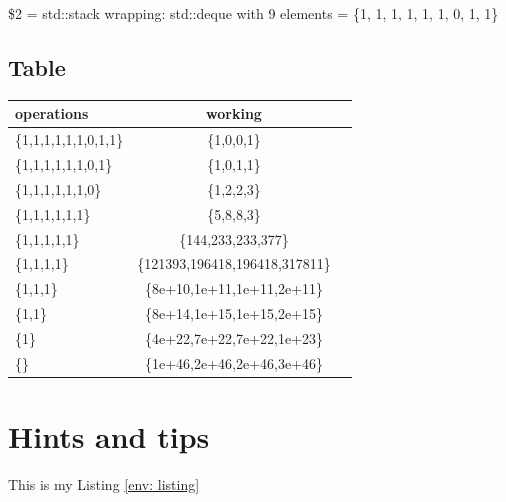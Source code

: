 \documentclass{article}
\theoremstyle{definition}
\begin{document}
\$2 = std::stack wrapping: std::deque with 9 elements = \{1, 1, 1, 1, 1, 1, 0, 1, 1\}

\subsection{Table}
\begin{center}
\begin{tabular}{ l | c | c } 
    \hline
    \textbf{operations} & \textbf{working} \\ 
    \hline
    \{1,1,1,1,1,1,0,1,1\} & \{1,0,0,1\} \\ 
    \hline
    \{1,1,1,1,1,1,0,1\} & \{1,0,1,1\} \\
    \hline
    \{1,1,1,1,1,1,0\} & \{1,2,2,3\} \\
    \hline
    \{1,1,1,1,1,1\} & \{5,8,8,3\} \\
    \hline
    \{1,1,1,1,1\} & \{144,233,233,377\} \\
    \hline
    \{1,1,1,1\} & \{121393,196418,196418,317811\} \\
    \hline
    \{1,1,1\} & \{8e+10,1e+11,1e+11,2e+11\} \\
    \hline
    \{1,1\} & \{8e+14,1e+15,1e+15,2e+15\}\\
    \hline
    \{1\} & \{4e+22,7e+22,7e+22,1e+23\} \\
    \hline
    \{\} & \{1e+46,2e+46,2e+46,3e+46\} \\
    \hline
\end{tabular}
\end{center}

\pagebreak

\section{Hints and tips}



This is my Listing \ref{env: listing}


\end{document}
